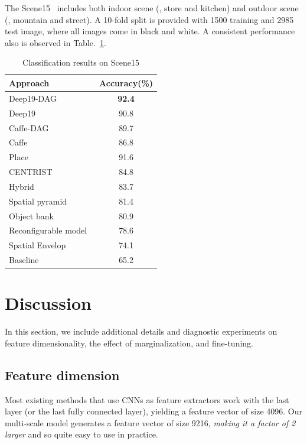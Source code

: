 \documentclass[10pt,twocolumn,letterpaper]{article}
\begin{document}
The Scene15~\cite{Scene15} includes both indoor scene (\eg, store and kitchen) and outdoor scene (\eg, mountain and street). A 10-fold split is provided with 1500 training and 2985 test image, where all images come in black and white. A consistent performance also is observed in Table.~\ref{table:Scene15}. 

\begin{table}[htbp]
\begin{center}
\begin{tabular}{|l|c|}
\hline
Approach & Accuracy(\%) \\
\hline
Deep19-DAG & \textbf{92.4} \\
Deep19~\cite{veryDeep} & 90.8 \\
Caffe-DAG & 89.7	\\
Caffe~\cite{Caffe} & 86.8 \\ \hline
Place~\cite{zhoulearning} & 91.6 \\
CENTRIST~\cite{Wu_pami11} & 84.8	\\
Hybrid~\cite{Bosch_pami08}	& 83.7	\\
Spatial pyramid~\cite{spatial_pyramid} & 81.4 \\
Object bank~\cite{Li_nips10_objectbank}	& 80.9	\\
Reconfigurable model~\cite{Parizi_cvpr12_reconf} & 78.6	\\
Spatial Envelop~\cite{Oliva_ijcv01_envelop} & 74.1 \\
Baseline~\cite{Scene15} & 65.2 \\
\hline
\end{tabular}
\end{center}
\caption{Classification results on Scene15}
\label{table:Scene15}
\end{table}


\section{Discussion}

In this section, we include additional details and diagnostic experiments on feature dimensionality, the effect of marginalization, and fine-tuning.

\subsection{Feature dimension}
Most existing methods that use CNNs as feature extractors work with the last layer (or the last fully connected layer), yielding a feature vector of size 4096. Our multi-scale model generates a feature vector of size 9216, {\em making it a factor of 2 larger} and so quite easy to use in practice.
\end{document}
